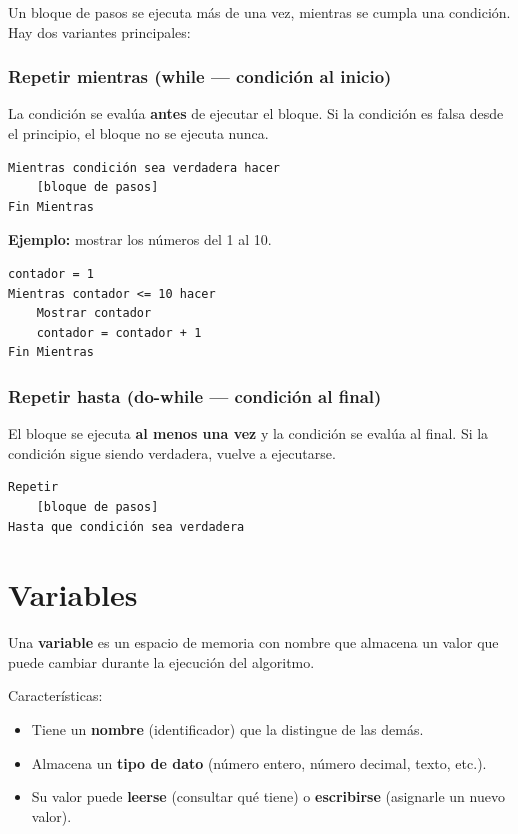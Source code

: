 Un bloque de pasos se ejecuta más de una vez, mientras se cumpla una condición. Hay dos variantes principales:

\subsubsection{Repetir mientras (while --- condición al inicio)}

La condición se evalúa \textbf{antes} de ejecutar el bloque. Si la condición es falsa desde el principio, el bloque no se ejecuta nunca.


\begin{lstlisting}[style=estilo-pseudocode]
Mientras condición sea verdadera hacer
    [bloque de pasos]
Fin Mientras
\end{lstlisting}

\textbf{Ejemplo:} mostrar los números del 1 al 10.
\begin{lstlisting}[style=estilo-pseudocode]
contador = 1
Mientras contador <= 10 hacer
    Mostrar contador
    contador = contador + 1
Fin Mientras
\end{lstlisting}

\subsubsection{Repetir hasta (do-while --- condición al final)}

El bloque se ejecuta \textbf{al menos una vez} y la condición se evalúa al final. Si la condición sigue siendo verdadera, vuelve a ejecutarse.

\begin{lstlisting}[style=estilo-pseudocode]
Repetir
    [bloque de pasos]
Hasta que condición sea verdadera
\end{lstlisting}

\section{Variables}

Una \textbf{variable} es un espacio de memoria con nombre que almacena un valor que puede cambiar durante la ejecución del algoritmo.

Características:
\begin{itemize}
    \item Tiene un \textbf{nombre} (identificador) que la distingue de las demás.
    \item Almacena un \textbf{tipo de dato} (número entero, número decimal, texto, etc.).
    \item Su valor puede \textbf{leerse} (consultar qué tiene) o \textbf{escribirse} (asignarle un nuevo valor).
\end{itemize}

